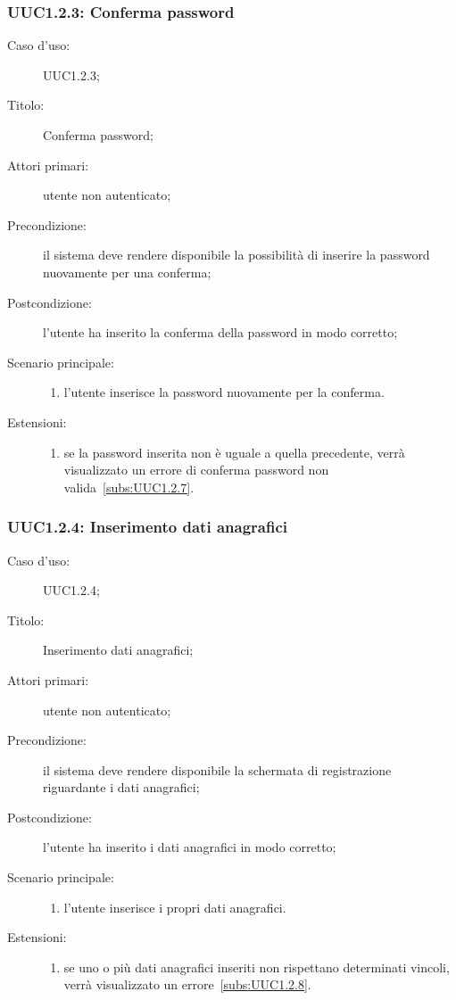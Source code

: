 \documentclass[../../../analisi-dei-requisiti.tex]{subfiles}
\begin{document}
\subsubsection{UUC1.2.3: Conferma password}%
\label{subs:UUC1.2.3}
\begin{description}
  \item[Caso d’uso:] UUC1.2.3;
  \item[Titolo:] Conferma password;
  \item[Attori primari:] utente non autenticato;
  \item[Precondizione:] il sistema deve rendere disponibile la possibilità di inserire la password nuovamente per una conferma;
  \item[Postcondizione:] l'utente ha inserito la conferma della password in modo corretto;
  \item[Scenario principale:]
        \begin{enumerate}
          \item l'utente inserisce la password nuovamente per la conferma.
        \end{enumerate}
  \item[Estensioni:]
        \begin{enumerate}
          \item se la password inserita non è uguale a quella precedente, verrà visualizzato un errore di conferma password non valida~\ref{subs:UUC1.2.7}.
        \end{enumerate}
\end{description}



\subsubsection{UUC1.2.4: Inserimento dati anagrafici}%
\label{subs:UUC1.2.4}
\begin{description}
  \item[Caso d’uso:] UUC1.2.4;
  \item[Titolo:] Inserimento dati anagrafici;
  \item[Attori primari:] utente non autenticato;
  \item[Precondizione:] il sistema deve rendere disponibile la schermata di registrazione riguardante i dati anagrafici;
  \item[Postcondizione:] l'utente ha inserito i dati anagrafici in modo corretto;
  \item[Scenario principale:]
        \begin{enumerate}
          \item l'utente inserisce i propri dati anagrafici.
        \end{enumerate}
  \item[Estensioni:]
        \begin{enumerate}
          \item se uno o più dati anagrafici inseriti non rispettano determinati vincoli, verrà visualizzato un errore~\ref{subs:UUC1.2.8}.
        \end{enumerate}
\end{description}
\end{document}
